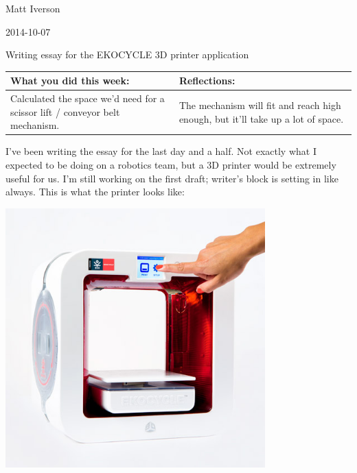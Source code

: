 Matt Iverson

2014-10-07

Writing essay for the EKOCYCLE 3D printer application

\begin{tabular}{|p{5cm}|p{5cm}|}
 \hline
 What you did this week: &
 Reflections: \\
 \hline
 Calculated the space we’d need for a scissor lift / conveyor belt mechanism. &
 The mechanism will fit and reach high enough, but it’ll take up a lot of space. \\
 \hline
\end{tabular}

I’ve been writing the essay for the last day and a half. Not exactly what I expected to be doing on a robotics team, but a 3D printer would be extremely useful for us. I’m still working on the first draft; writer’s block is setting in like always. This is what the printer looks like:

\includegraphics[width=10cm]{./Entries/Images/ekocycle.jpg}
